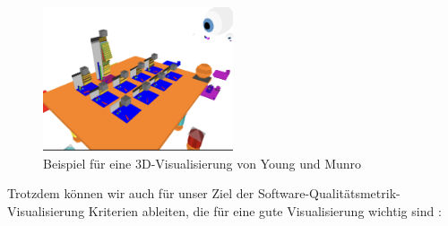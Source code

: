 \begin{figure}[h]
    \centering
    \includegraphics[width=0.5\textwidth]{images/visVRExample.png}
    \caption{Beispiel für eine 3D-Visualisierung von Young und Munro \cite[6]{visSoftwareVR}}
    \label{fig:3DVis}
\end{figure}

Trotzdem können wir auch für unser Ziel der Software-Qualitätsmetrik-Visualisierung Kriterien ableiten, die für eine gute Visualisierung wichtig sind \cite{visSoftwareVR}:
